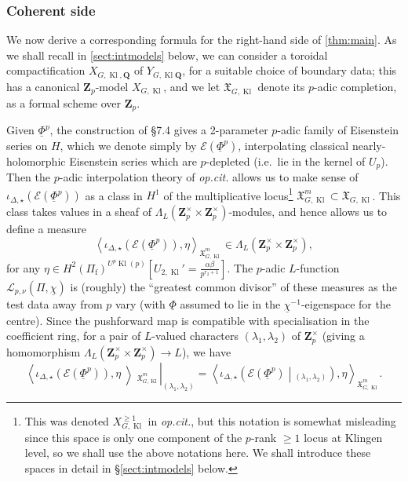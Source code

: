 \documentclass[cjm]{ipart}
\theoremstyle{plain}
\theoremstyle{remark}
\DeclareMathOperator{\Kl}{Kl}
\newcommand{\Pif}{\Pi_{\mathrm{f}}}
\newcommand{\QQ}{\mathbf{Q}}
\newcommand{\Zp}{\mathbf{Z}_p}
\newcommand{\cE}{\mathcal{E}}
\newcommand{\cL}{\mathcal{L}}
\newcommand{\uPhi}{\underline{\Phi}}
\newcommand{\uchi}{\underline{\chi}}
\numberwithin{equation}{subsection}
\renewcommand{\ge}{\geqslant}
\begin{document}
  \subsubsection*{Coherent side} We now derive a corresponding formula for the right-hand side of \cref{thm:main}. As we shall recall in \cref{sect:intmodels} below, we can consider a toroidal compactification $X_{G, \Kl, \QQ}$ of $Y_{G, \Kl \QQ}$, for a suitable choice of boundary data; this has a canonical $\Zp$-model $X_{G,\Kl}$, and we let $\mathfrak{X}_{G,\Kl}$ denote its $p$-adic completion, as a formal scheme over $\Zp$.

  Given $\uPhi^p$, the construction of \cite{LPSZ1} \S 7.4 gives a 2-parameter $p$-adic family of Eisenstein series on $H$, which we denote simply by $\cE(\uPhi^p)$, interpolating classical nearly-holomorphic Eisenstein series which are $p$-depleted (i.e.~lie in the kernel of $U_p$). Then the $p$-adic interpolation theory of \emph{op.cit.} allows us to make sense of $\iota_{\Delta, \star}\left(\cE(\uPhi^p)\right)$ as a class in $H^1$ of the multiplicative locus\footnote{This was denoted $X_{G, \Kl}^{\ge 1}$ in \emph{op.cit.}, but this notation is somewhat misleading since this space is only one component of the $p$-rank $\ge 1$ locus at Klingen level, so we shall use the above notations here. We shall introduce these spaces in detail in \S \ref{sect:intmodels} below.} $\mathfrak{X}_{G, \Kl}^m \subset \mathfrak{X}_{G, \Kl}$. This class takes values in a sheaf of $\Lambda_L(\Zp^\times \times \Zp^\times)$-modules, and hence allows us to define a measure
  \[
   \left\langle \iota_{\Delta, \star}\left(\cE(\uPhi^p)\right), \eta \right\rangle_{\mathfrak{X}_{G, \Kl}^{m}} \in \Lambda_L(\Zp^\times \times \Zp^\times),
  \]
  for any $\eta \in H^2(\Pif)^{U^p\Kl(p)}[U_{2, \Kl}' = \frac{\alpha\beta}{p^{r_2 + 1}}]$. The $p$-adic $L$-function $\cL_{p, \nu}(\Pi, \uchi)$ is (roughly) the ``greatest common divisor'' of these measures as the test data away from $p$ vary (with $\uPhi$ assumed to lie in the $\uchi^{-1}$-eigenspace for the centre). Since the pushforward map is compatible with specialisation in the coefficient ring, for a pair of $L$-valued characters $(\lambda_1, \lambda_2)$ of $\Zp^\times$ (giving a homomorphism $\Lambda_L(\Zp^\times \times \Zp^\times) \to L$), we have
  \[ \left\langle \iota_{\Delta, \star}\left(\cE(\uPhi^p)\right), \eta \middle\rangle_{\mathfrak{X}_{G, \Kl}^{m}} \right|_{(\lambda_1, \lambda_2)} = \left\langle \iota_{\Delta, \star}\left(\cE(\uPhi^p)\middle|_{(\lambda_1, \lambda_2)}\right), \eta \right\rangle_{\mathfrak{X}_{G, \Kl}^{m}}.\]
\end{document}
